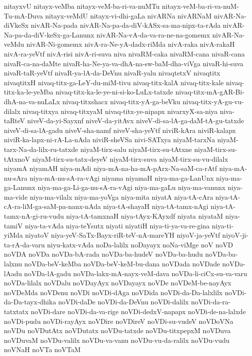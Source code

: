 {nitayxvU
nitayx-veMba
nitayx-veM-ba-ri-va-nuMTu
nitayx-veM-ba-ri-va-nuM-Tu-mA-Duva
nitayx-veMdU
nitayx-vi-dhi-gaLa
nivARNa
nivARNaM
nivAR-Na-diVkeSx
nivAR-Na-pada
nivAR-Na-pa-da-diV-kASx-sa-ma-nipx-ta-rAda
nivAR-Na-pa-da-diV-keSx-ga-Lanunx
nivAR-Na-vA-da-va-ra-ne-na-gomemx
nivAR-Na-veMdu
nivAR-Ni-gomemx
nivA-ra-Ne-yA-dadx-riMda
nivA-raka
nivA-rakaH
nivA-ra-yeVtf
nivA-risi
nivA-ri-suva
niva
nivaRM-caka
nivaRM-cana
nivaR-cana
nivaR-ca-na-daMte
nivaR-ha-Ne-ya-va-dhA-na-sw-baM-dha-viVga
nivaR-hi-suva
nivaR-taR-yeVtf
nivaR-ya-lA-da-DeVnu
nivaR-yalu
nivaqtetxV
nivaqtitx
nivaqtitxH
nivaq-titx-ga-LeY-du-miM-tivu
nivaq-titx-kalA
nivaq-titx-kale
nivaq-titx-ka-le-yeMba
nivaq-titx-ka-le-ye-ni-si-ko-LuLx-tatxde
nivaq-titx-mA-gAR-Bi-dhA-na-va-nuLaLx
nivaq-titxshacx
nivaq-titx-yA-ga-beVku
nivaq-titx-yA-gu-vu-dilalx
nivaq-titxya
nivaq-titxyaM
nivaq-titx-ye-nipapx
nivarxyX-sa-niya
niva-taRteV
niveV-da-yi-Sayxnf
niveV-da-yitAvx
niveV-di-sa-lA-ga-daM-tA-gu-tatxde
niveV-di-sa-lA-gadu
niveV-sha-namf
niveV-sha-yeVtf
niviR-kAra
niviR-kalapx
niviR-ka-lapx-ni-rA-La-nAda
niviR-sheVSa
nivi-SATxya
niyaM-tarxNa
niyaM-tarx-Na-da-lilx-ru-tatxde
niyaM-tirx-salu
niyaM-tirx-su-tAtxne
niyaM-tirx-su-tAtxnoV
niyaM-tirx-su-tatx-deyeV
niyaM-tirx-suva
niyaM-tirx-su-vu-dilalx
niyamA
niyamAH
niya-mAdi
niya-mA-na-ha-mA-pArx-Na-saM-ca-rAtf
niya-mA-nu-sAra
niya-mA-nu-sA-ra-vAgi
niyama
niyamaH
niya-ma-ga-LanUnx
niya-ma-ga-Lanunx
niya-ma-ga-Li-ga-nu-sA-ra-vAgi
niya-ma-gaLu
niya-ma-vanunx
niya-ma-vide
niya-ma-vilalx
niya-ma-yoVga
niya-mita
niyatA
niya-tA-cAra
niya-tA-cA-ra-liM-ga-saM-pa-nanx-nAda
niya-tA-shayaH
niya-tA-tamx-nAgi
niya-tA-tamx-nA-gi-ru-vudu
niya-tA-tamxnaH
niya-tAyx-KAyxdf
niyata
niyataM
niya-tamiV
niya-ta-vAda
niya-teYsutx
niyati
niyatiH
niya-ti-ya-va-re-gina
niya-ti-yiMda
niyatoV
niya-yeV-SaTx-Bayx-riR-teV-nA-mareYH
niyoV-ja-yeVtf
niyoV-ji-ta-rA-da-varu
niyu-katx-vAda
noDa-lalilx
noDayayx
noNa-viMge
noV
noVD
noVDA
noVDa
noVDa-bA-rada
noVDa-ba-hudeV
noVDa-ba-hudu
noVDa-ba-lalxnu
noVDa-beV-keMba
noVDa-beV-keM-bu-dana
noVDada
noVDade
noVDa-lAadu
noVDa-lA-gadu
noVDa-lakx-mA-nayx-veM-dava
noVDa-li-ciCx-su-va-varu
noVDa-lilalx
noVDalu
noVDayAyx
noVDayayx
noVDe
noVDeM-be-nayAyx
noVDeMda
noVDenu
noVDi
noVDi-dAga
noVDida
noVDi-da-Da-lalxlilx
noVDi-da-Da-tayx-dhika
noVDi-daDe
noVDi-da-DeVnu
noVDi-dalilx
noVDi-da-ra-tatxtatx
noVDi-dare
noVDi-da-va-rige
noVDi-dedxV-napapx
noVDi-de-na-lalxde
noVDi-pudu
noVDi-rayAyx
noVDire
noVDireV
noVDi-su-vudeV
noVDoVNa
noVDu
noVDutAtx
noVDutatx
noVDu-tatxde
noVDu-titxpepxM
noVDuva
noVDuvaM
noVDu-valilx
noVDu-va-vanu
noVDu-vu-da-ralilx
noVDu-vudu
noVNaH
noVTa
noVTaM
}
